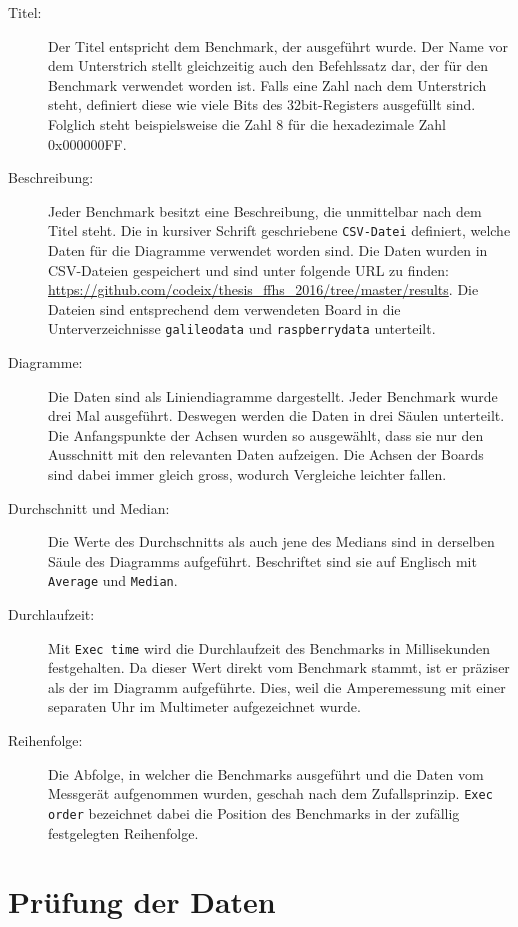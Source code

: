 \begin{description}
\item[Titel:]
Der Titel entspricht dem Benchmark, der ausgeführt wurde. Der Name vor dem Unterstrich stellt gleichzeitig auch den Befehlssatz dar, der für den Benchmark verwendet worden ist. Falls eine Zahl nach dem Unterstrich steht, definiert diese wie viele Bits des 32bit-Registers ausgefüllt sind. Folglich steht beispielsweise die Zahl 8 für die hexadezimale Zahl 0x000000FF.
\item[Beschreibung:]
Jeder Benchmark besitzt eine Beschreibung, die unmittelbar nach dem Titel steht. Die in kursiver Schrift geschriebene \texttt{CSV-Datei} definiert, welche Daten für die Diagramme verwendet worden sind. Die Daten wurden in CSV-Dateien gespeichert und sind unter folgende URL zu finden: \url{https://github.com/codeix/thesis_ffhs_2016/tree/master/results}. Die Dateien sind entsprechend dem verwendeten Board in die Unterverzeichnisse \texttt{galileodata} und \texttt{raspberrydata} unterteilt. 
\item[Diagramme:]
Die Daten sind als Liniendiagramme dargestellt. Jeder Benchmark wurde drei Mal ausgeführt. Deswegen werden die Daten in drei Säulen unterteilt. Die Anfangspunkte der Achsen wurden so ausgewählt, dass sie nur den Ausschnitt mit den relevanten Daten aufzeigen. Die Achsen der Boards sind dabei immer gleich gross, wodurch Vergleiche leichter fallen.
\item[Durchschnitt und Median:]
Die Werte des Durchschnitts als auch jene des Medians sind in derselben Säule des Diagramms aufgeführt. Beschriftet sind sie auf Englisch mit \texttt{Average} und \texttt{Median}.
\item[Durchlaufzeit:]
Mit \texttt{Exec time} wird die Durchlaufzeit des Benchmarks in Millisekunden festgehalten. Da dieser Wert direkt vom Benchmark stammt, ist er präziser als der im Diagramm aufgeführte. Dies, weil die Amperemessung mit einer separaten Uhr im Multimeter aufgezeichnet wurde.
\item[Reihenfolge:] Die Abfolge, in welcher die Benchmarks ausgeführt und die Daten vom Messgerät aufgenommen wurden, geschah nach dem Zufallsprinzip. \texttt{Exec order} bezeichnet dabei die Position des Benchmarks in der zufällig festgelegten Reihenfolge.

\end{description}



\section{Prüfung der Daten}

